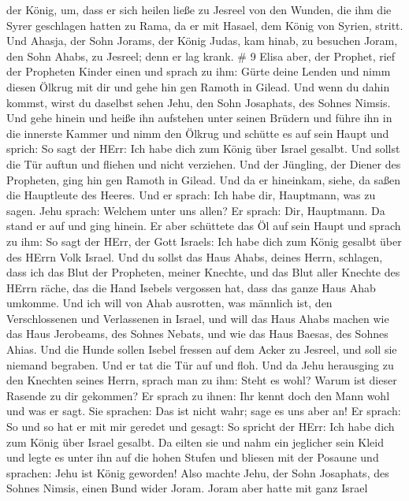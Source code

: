 der König, um, dass er sich heilen ließe zu Jesreel von den Wunden, die
ihm die Syrer geschlagen hatten zu Rama, da er mit Hasael, dem König von
Syrien, stritt. Und Ahasja, der Sohn Jorams, der König Judas, kam hinab,
zu besuchen Joram, den Sohn Ahabs, zu Jesreel; denn er lag krank. \# 9
 Elisa aber, der Prophet, rief der Propheten Kinder einen
und sprach zu ihm: Gürte deine Lenden und nimm diesen Ölkrug mit dir und
gehe hin gen Ramoth in Gilead.  Und wenn du dahin kommst,
wirst du daselbst sehen Jehu, den Sohn Josaphats, des Sohnes Nimsis. Und
gehe hinein und heiße ihn aufstehen unter seinen Brüdern und führe ihn
in die innerste Kammer  und nimm den Ölkrug und schütte es
auf sein Haupt und sprich: So sagt der HErr: Ich habe dich zum König
über Israel gesalbt. Und sollst die Tür auftun und fliehen und nicht
verziehen.  Und der Jüngling, der Diener des Propheten, ging
hin gen Ramoth in Gilead.  Und da er hineinkam, siehe, da
saßen die Hauptleute des Heeres. Und er sprach: Ich habe dir, Hauptmann,
was zu sagen. Jehu sprach: Welchem unter uns allen? Er sprach: Dir,
Hauptmann.  Da stand er auf und ging hinein. Er aber
schüttete das Öl auf sein Haupt und sprach zu ihm: So sagt der HErr, der
Gott Israels: Ich habe dich zum König gesalbt über des HErrn Volk
Israel.  Und du sollst das Haus Ahabs, deines Herrn,
schlagen, dass ich das Blut der Propheten, meiner Knechte, und das Blut
aller Knechte des HErrn räche, das die Hand Isebels vergossen hat,
 dass das ganze Haus Ahab umkomme. Und ich will von Ahab
ausrotten, was männlich ist, den Verschlossenen und Verlassenen in
Israel,  und will das Haus Ahabs machen wie das Haus
Jerobeams, des Sohnes Nebats, und wie das Haus Baesas, des Sohnes Ahias.
 Und die Hunde sollen Isebel fressen auf dem Acker zu
Jesreel, und soll sie niemand begraben. Und er tat die Tür auf und floh.
 Und da Jehu herausging zu den Knechten seines Herrn,
sprach man zu ihm: Steht es wohl? Warum ist dieser Rasende zu dir
gekommen? Er sprach zu ihnen: Ihr kennt doch den Mann wohl und was er
sagt.  Sie sprachen: Das ist nicht wahr; sage es uns aber
an! Er sprach: So und so hat er mit mir geredet und gesagt: So spricht
der HErr: Ich habe dich zum König über Israel gesalbt.  Da
eilten sie und nahm ein jeglicher sein Kleid und legte es unter ihn auf
die hohen Stufen und bliesen mit der Posaune und sprachen: Jehu ist
König geworden!  Also machte Jehu, der Sohn Josaphats, des
Sohnes Nimsis, einen Bund wider Joram. Joram aber hatte mit ganz Israel
